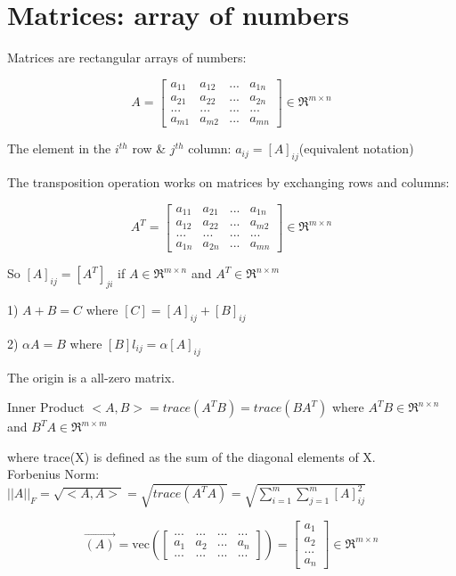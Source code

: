 \section{Matrices: array of numbers}





Matrices are rectangular arrays of numbers:

$$
A = 
\left[
\begin{matrix}
a_{11} & a_{12} & ... & a_{1n} \\
a_{21} & a_{22} & ... & a_{2n} \\
... & ... & ... & ...\\
a_{m1} & a_{m2} & ... & a_{mn}
\end{matrix}
\right] \in \Re^{m\times n}
$$


The element in the $i^{th}$ row \& $j^{th}$ column: $a_{ij} = [A]_{ij}$(equivalent notation)

The transposition operation works on matrices by exchanging rows and columns: 

$$
A^T = 
\left[
\begin{matrix}
a_{11} & a_{21} & ... & a_{1n} \\
a_{12} & a_{22} & ... & a_{m2} \\
... & ... & ... & ...\\
a_{1n} & a_{2n} & ... & a_{mn}
\end{matrix}
\right] \in \Re^{m\times n}
$$

So $[A]_{ij}  = [A^T]_{ji}$ if $A\in \Re^{m\times n}$ and $A^T\in \Re^{n\times m}$


1) $A + B = C$ where $[C] = [A]_{ij} + [B]_{ij}$

2) $\alpha A = B$ where $[B]l_{ij} = \alpha [A]_{ij}$

The origin is a all-zero matrix. 

\begin{definition}{Inner Product}
	$<A, B> = trace(A^TB) = trace(BA^T)$ where $A^TB\in \Re^{n\times n}$ and $B^TA\in \Re^{m\times m}$
\end{definition}

where trace(X) is defined as the sum of the diagonal elements of X. \\

Forbenius Norm: $||A||_F = \sqrt{<A, A>} = \sqrt{trace(A^TA)} = \sqrt{\sum^m_{i=1}\sum^m_{j=1}[A]^2_{ij}}$


$$\vec{(A)} = \text{vec}
\left(
\left[
\begin{matrix}
... & ... & ... & ... \\
a_{1} & a_{2} & ... & a_{n} \\
... & ... & ... & ...
\end{matrix}
\right]\right) = 
\left[
\begin{matrix}
a_{1} \\
a_{2} \\
... \\
a_{n}
\end{matrix}
\right]
\in \Re^{m\times n}
$$

